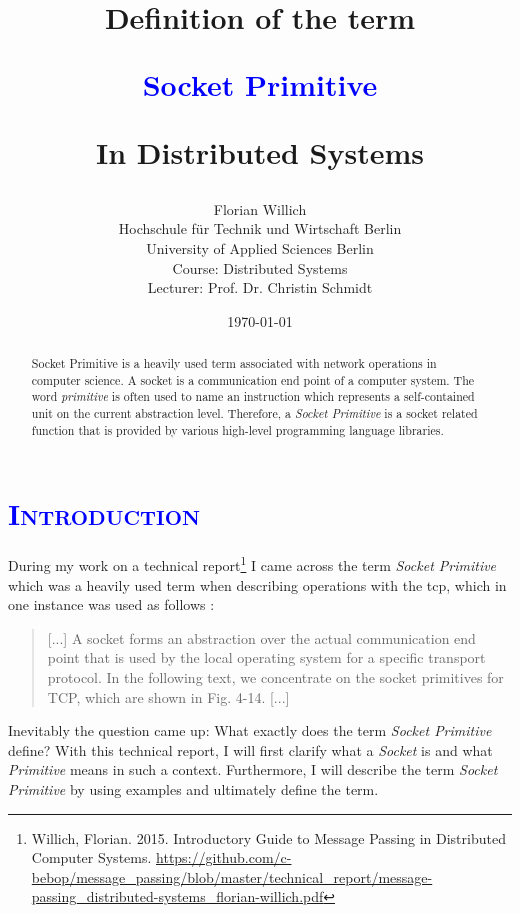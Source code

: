 \documentclass[xcolor=dvipsnames]{article}
\title{
\scshape{
\begin{large}
Definition of the term\\
\end{large} 
\textbf{\textcolor{blue}{Socket Primitive}}\\
\begin{large}
In Distributed Systems
\end{large}
}}
\author{Florian Willich \\ Hochschule f\"ur Technik und Wirtschaft Berlin \\ University of Applied Sciences Berlin \\ Course: Distributed Systems \\ Lecturer: Prof. Dr. Christin Schmidt}
\date{\today}
\begin{document}

\begin{titlepage}

\maketitle

\begin{abstract}
Socket Primitive is a heavily used term associated with network operations in computer science. A socket is a communication end point of a computer system. The word \textit{primitive} is often used to name an instruction which represents a self-contained unit on the current abstraction level. Therefore, a \textit{Socket Primitive} is a socket related function that is provided by various high-level programming language libraries.
\end{abstract}

\end{titlepage}

\newpage

\tableofcontents

\newpage



\section{\scshape{\textcolor{blue}{Introduction}}} \label{introduction}

During my work on a technical report\footnote{Willich, Florian. 2015. Introductory Guide to Message Passing in Distributed Computer Systems. \url{https://github.com/c-bebop/message_passing/blob/master/technical_report/message-passing_distributed-systems_florian-willich.pdf}} I came across the term \textit{Socket Primitive} which was a heavily used term when describing operations with the \gls{tcp}, which in one instance was used as follows \cite[p. 141, ch. 4.3.1]{tanenbaum}:

\begin{quote}\label{tanenbaum_quote}
[...] A socket forms an abstraction over the actual communication end
point that is used by the local operating system for a specific
transport protocol. In the following text, we concentrate on the socket
primitives for TCP, which are shown in Fig. 4-14. [...] 
\end{quote}

\noindent Inevitably the question came up: What exactly does the term \textit{Socket Primitive} define?  With this technical report, I will first clarify what a \textit{Socket} is and what \textit{Primitive} means in such a context. Furthermore, I will describe the term \textit{Socket Primitive} by using examples and ultimately define the term.\\
\end{document}
